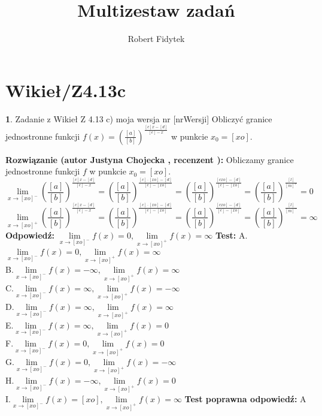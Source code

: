 \documentclass[12pt, a4paper]{article}
\title{Multizestaw zadań}
\author{Robert Fidytek}
\date{}
\theoremstyle{definition} %
\newtheorem{zad}{}
\newcommand{\kategoria}[1]{\section{#1}} %
\newcommand{\zadStart}[1]{\begin{zad}#1\newline} %
\newcommand{\zadStop}{\end{zad}}   %
\newcommand{\rozwStart}[2]{\noindent \textbf{Rozwiązanie (autor #1 , recenzent #2): }\newline} %
\newcommand{\rozwStop}{\newline}                                            %
\newcommand{\odpStart}{\noindent \textbf{Odpowiedź:}\newline}    %
\newcommand{\odpStop}{\newline}                                             %
\newcommand{\testStart}{\noindent \textbf{Test:}\newline} %
\newcommand{\testStop}{\newline} %
\newcommand{\kluczStart}{\noindent \textbf{Test poprawna odpowiedź:}\newline} %
\newcommand{\kluczStop}{\newline} %
\begin{document}
\maketitle


\kategoria{Wikieł/Z4.13c}
\zadStart{Zadanie z Wikieł Z 4.13 c) moja wersja nr [nrWersji]}
Obliczyć granice jednostronne funkcji $f(x)=\left(\frac{[a]}{[b]}\right)^{\frac{[c]x-[d]}{[e]-x}}$ w punkcie $x_{0}=[xo]$. 
\zadStop
\rozwStart{Justyna Chojecka}{}
Obliczamy granice jednostronne funkcji $f$ w punkcie $x_{0}=[xo]$.
$$\lim\limits_{x\to [xo]^{-}}\left(\frac{[a]}{[b]}\right)^{\frac{[c]x-[d]}{[e]-x}}=\left(\frac{[a]}{[b]}\right)^{\frac{[c]\cdot[xo]-[d]}{[e]-[xo]}}=\left(\frac{[a]}{[b]}\right)^{\frac{[cxo]-[d]}{[e]-[xo]}}=\left(\frac{[a]}{[b]}\right)^{\frac{[l]}{[m]^{+}}}=0$$
$$\lim\limits_{x\to [xo]^{+}}\left(\frac{[a]}{[b]}\right)^{\frac{[c]x-[d]}{[e]-x}}=\left(\frac{[a]}{[b]}\right)^{\frac{[c]\cdot[xo]-[d]}{[e]-[xo]}}=\left(\frac{[a]}{[b]}\right)^{\frac{[cxo]-[d]}{[e]-[xo]}}=\left(\frac{[a]}{[b]}\right)^{\frac{[l]}{[m]^{-}}}=\infty$$
\rozwStop
\odpStart
$\lim\limits_{x\to [xo]^{-}}f(x)=0, \lim\limits_{x\to [xo]^{+}}f(x)=\infty$
\odpStop
\testStart
A.$\lim\limits_{x\to [xo]^{-}}f(x)=0, \lim\limits_{x\to [xo]^{+}}f(x)=\infty$\\
B.$\lim\limits_{x\to [xo]^{-}}f(x)=-\infty, \lim\limits_{x\to [xo]^{+}}f(x)=\infty$\\
C.$\lim\limits_{x\to [xo]^{-}}f(x)=\infty, \lim\limits_{x\to [xo]^{+}}f(x)=-\infty$\\
D.$\lim\limits_{x\to [xo]^{-}}f(x)=\infty, \lim\limits_{x\to [xo]^{+}}f(x)=\infty$\\
E.$\lim\limits_{x\to [xo]^{-}}f(x)=\infty, \lim\limits_{x\to [xo]^{+}}f(x)=0$\\
F.$\lim\limits_{x\to [xo]^{-}}f(x)=0, \lim\limits_{x\to [xo]^{+}}f(x)=0$\\
G.$\lim\limits_{x\to [xo]^{-}}f(x)=0, \lim\limits_{x\to [xo]^{+}}f(x)=-\infty$\\
H.$\lim\limits_{x\to [xo]^{-}}f(x)=-\infty, \lim\limits_{x\to [xo]^{+}}f(x)=0$\\
I.$\lim\limits_{x\to [xo]^{-}}f(x)=[xo], \lim\limits_{x\to [xo]^{+}}f(x)=\infty$
\testStop
\kluczStart
A
\kluczStop
\end{document}
